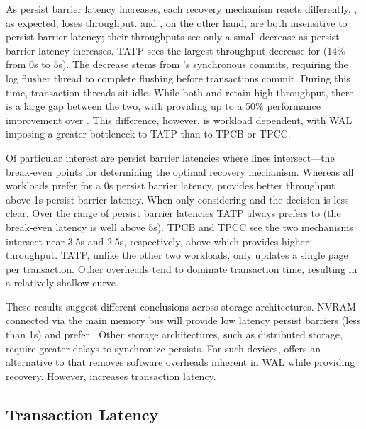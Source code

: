 As persist barrier latency increases, each recovery mechanism reacts differently.
\InPlace, as expected, loses throughput.
\NVDisk and \GroupCommit, on the other hand, are both insensitive to persist barrier latency; their throughputs see only a small decrease as persist barrier latency increases.
TATP sees the largest throughput decrease for \NVDisk (14\% from 0\textmu s to 5\textmu s).
The decrease stems from \NVDisk's synchronous commits, requiring the log flusher thread to complete flushing before transactions commit.
During this time, transaction threads sit idle.
While both \NVDisk and \GroupCommit retain high throughput, there is a large gap between the two, with \GroupCommit providing up to a 50\% performance improvement over \NVDisk.
This difference, however, is workload dependent, with WAL imposing a greater bottleneck to TATP than to TPCB or TPCC.

Of particular interest are persist barrier latencies where lines intersect---the break-even points for determining the optimal recovery mechanism.
Whereas all workloads prefer \InPlace for a 0\textmu s persist barrier latency, \GroupCommit provides better throughput above 1\textmu s persist barrier latency.
When only considering \InPlace and \NVDisk the decision is less clear.
Over the range of persist barrier latencies TATP always prefers \InPlace to \NVDisk (the break-even latency is well above 5\textmu s).
TPCB and TPCC see the two mechanisms intersect near 3.5\textmu s and 2.5\textmu s, respectively, above which \NVDisk provides higher throughput.
TATP, unlike the other two workloads, only updates a single page per transaction.
Other overheads tend to dominate transaction time, resulting in a relatively shallow \InPlace curve.

These results suggest different conclusions across storage architectures.
NVRAM connected via the main memory bus will provide low latency persist barriers (less than 1\textmu s) and prefer \InPlace.
Other storage architectures, such as distributed storage, require greater delays to synchronize persists.
For such devices, \GroupCommit offers an alternative to \NVDisk that removes software overheads inherent in WAL while providing recovery.
However, \GroupCommit increases transaction latency.

\subsection{Transaction Latency}
\label{sec:OLTP_eval:Persists:XctLatency}

